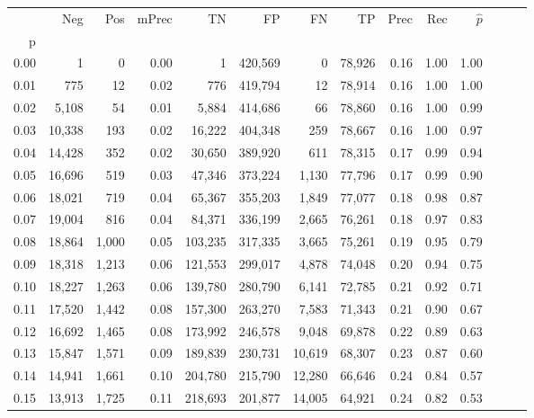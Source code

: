 \begin{tabular}{rrrrrrrrrrrrrr}
\toprule
{} &     Neg &    Pos & mPrec &       TN &       FP &      FN &      TP &  Prec &   Rec & $\hat{p}$ \\
p    &         &        &       &          &          &         &         &       &       &           \\
\midrule
0.00 &       1 &      0 &  0.00 &        1 &  420,569 &       0 &  78,926 &  0.16 &  1.00 &      1.00 \\
0.01 &     775 &     12 &  0.02 &      776 &  419,794 &      12 &  78,914 &  0.16 &  1.00 &      1.00 \\
0.02 &   5,108 &     54 &  0.01 &    5,884 &  414,686 &      66 &  78,860 &  0.16 &  1.00 &      0.99 \\
0.03 &  10,338 &    193 &  0.02 &   16,222 &  404,348 &     259 &  78,667 &  0.16 &  1.00 &      0.97 \\
0.04 &  14,428 &    352 &  0.02 &   30,650 &  389,920 &     611 &  78,315 &  0.17 &  0.99 &      0.94 \\
0.05 &  16,696 &    519 &  0.03 &   47,346 &  373,224 &   1,130 &  77,796 &  0.17 &  0.99 &      0.90 \\
0.06 &  18,021 &    719 &  0.04 &   65,367 &  355,203 &   1,849 &  77,077 &  0.18 &  0.98 &      0.87 \\
0.07 &  19,004 &    816 &  0.04 &   84,371 &  336,199 &   2,665 &  76,261 &  0.18 &  0.97 &      0.83 \\
0.08 &  18,864 &  1,000 &  0.05 &  103,235 &  317,335 &   3,665 &  75,261 &  0.19 &  0.95 &      0.79 \\
0.09 &  18,318 &  1,213 &  0.06 &  121,553 &  299,017 &   4,878 &  74,048 &  0.20 &  0.94 &      0.75 \\
0.10 &  18,227 &  1,263 &  0.06 &  139,780 &  280,790 &   6,141 &  72,785 &  0.21 &  0.92 &      0.71 \\
0.11 &  17,520 &  1,442 &  0.08 &  157,300 &  263,270 &   7,583 &  71,343 &  0.21 &  0.90 &      0.67 \\
0.12 &  16,692 &  1,465 &  0.08 &  173,992 &  246,578 &   9,048 &  69,878 &  0.22 &  0.89 &      0.63 \\
0.13 &  15,847 &  1,571 &  0.09 &  189,839 &  230,731 &  10,619 &  68,307 &  0.23 &  0.87 &      0.60 \\
0.14 &  14,941 &  1,661 &  0.10 &  204,780 &  215,790 &  12,280 &  66,646 &  0.24 &  0.84 &      0.57 \\
0.15 &  13,913 &  1,725 &  0.11 &  218,693 &  201,877 &  14,005 &  64,921 &  0.24 &  0.82 &      0.53 \\

\end{tabular}
